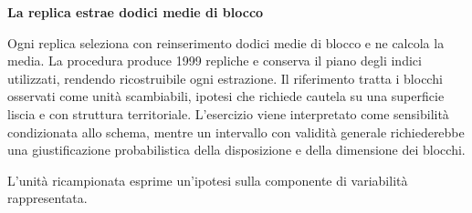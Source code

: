 \documentclass[12pt,aspectratio=1610]{beamer}
\begin{document}
\begin{lrbox}{\TitleBox}\begin{minipage}[t]{18.2cm}\raggedright\sloppy\color{Ink}\fontsize{20.7}{24}\selectfont \bfseries\color{Navy}La replica estrae dodici medie di blocco\end{minipage}\end{lrbox}
\begin{lrbox}{\BodyBox}\begin{minipage}[t]{10.25cm}\raggedright\sloppy\color{Ink}\fontsize{12.4}{16.4}\selectfont Ogni replica seleziona con reinserimento dodici medie di blocco e ne calcola la media. La procedura produce 1999 repliche e conserva il piano degli indici utilizzati, rendendo ricostruibile ogni estrazione. Il riferimento tratta i blocchi osservati come unità scambiabili, ipotesi che richiede cautela su una superficie liscia e con struttura territoriale. L’esercizio viene interpretato come sensibilità condizionata allo schema, mentre un intervallo con validità generale richiederebbe una giustificazione probabilistica della disposizione e della dimensione dei blocchi.\par{}\end{minipage}\end{lrbox}
\begin{lrbox}{\SideBox}\begin{minipage}[t]{7.45cm}\raggedright\sloppy\color{Ink}\fontsize{12.2}{16.1}\selectfont \par{}\end{minipage}\end{lrbox}
\begin{lrbox}{\RecallBox}\begin{minipage}[t]{16.45cm}\raggedright\sloppy\color{Ink}\fontsize{10.1}{13.2}\selectfont L’unità ricampionata esprime un’ipotesi sulla componente di variabilità rappresentata.\end{minipage}\end{lrbox}
\end{document}
